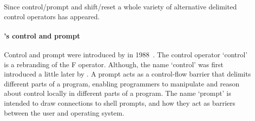 \documentclass[12pt,phd,lfcs,twoside,openright,logo,leftchapter,normalheadings]{infthesis}
\theoremstyle{plain}
\theoremstyle{definition}
\begin{document}

Since control/prompt and shift/reset a whole variety of alternative
delimited control operators has appeared.



\paragraph{\citeauthor{Felleisen88}'s control and prompt}
%
Control and prompt were introduced by \citeauthor{Felleisen88} in
1988~\cite{Felleisen88}.  The control operator `control' is a
rebranding of the F operator. Although, the name `control' was first
introduced a little later by \citet{SitaramF90}.  A prompt acts as a
control-flow barrier that delimits different parts of a program,
enabling programmers to manipulate and reason about control locally in
different parts of a program. The name `prompt' is intended to draw
connections to shell prompts, and how they act as barriers between the
user and operating system.
%
\end{document}
